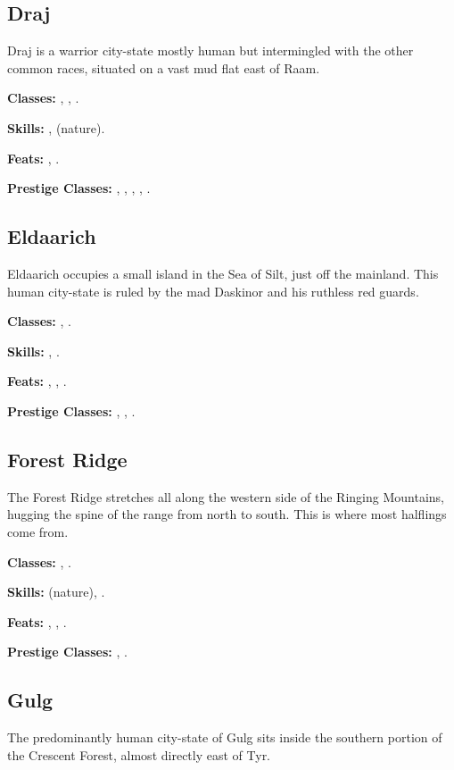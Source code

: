 \subsection{Draj}
Draj is a warrior city-state mostly human but intermingled with the other common races, situated on a vast mud flat east of Raam.

\textbf{Classes:} , , .

\textbf{Skills:} ,  (nature).

\textbf{Feats:} , .

\textbf{Prestige Classes:} , , , , .

\subsection{Eldaarich}
Eldaarich occupies a small island in the Sea of Silt, just off the mainland. This human city-state is ruled by the mad Daskinor and his ruthless red guards.

\textbf{Classes:} , .

\textbf{Skills:} , .

\textbf{Feats:} , , .

\textbf{Prestige Classes:} , , .


\subsection{Forest Ridge}
The Forest Ridge stretches all along the western side of the Ringing Mountains, hugging the spine of the range from north to south. This is where most halflings come from.

\textbf{Classes:} , .

\textbf{Skills:}  (nature), .

\textbf{Feats:} , , .

\textbf{Prestige Classes:} , .


\subsection{Gulg}
The predominantly human city-state of Gulg sits inside the southern portion of the Crescent Forest, almost directly east of Tyr.


